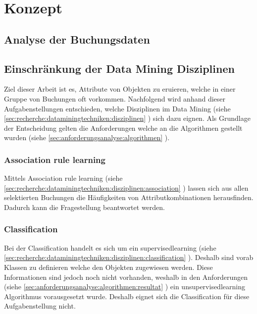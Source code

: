 \chapter{Konzept}
\label{sec:konzept}

\section{Analyse der Buchungsdaten}

\section{Einschränkung der Data Mining Disziplinen}
\label{sec:konzept:disziplinauswahl}
Ziel dieser Arbeit ist es, Attribute von Objekten zu eruieren, welche in einer Gruppe von Buchungen oft vorkommen. Nachfolgend wird anhand dieser Aufgabenstellungen entschieden, welche Disziplinen im Data Mining (siehe \cref{sec:recherche:dataminingtechniken:disziplinen} ) sich dazu eignen. Als Grundlage der Entscheidung gelten die Anforderungen welche an die Algorithmen gestellt wurden (siehe \cref{sec:anforderungsanalyse:algorithmen} ).

\subsection{Association rule learning}
\label{sec:konzept:disziplinauswahl:association}
Mittels Association rule learning (siehe \cref{sec:recherche:dataminingtechniken:disziplinen:association} ) lassen sich aus allen selektierten Buchungen die Häufigkeiten von Attributkombinationen herausfinden. Dadurch kann die Fragestellung beantwortet werden.


\subsection{Classification}
\label{sec:konzept:disziplinauswahl:classification}
Bei der Classification handelt es sich um ein \gls{supervisedlearning} (siehe \cref{sec:recherche:dataminingtechniken:disziplinen:classification} ). Deshalb sind vorab Klassen zu definieren welche den Objekten zugewiesen werden. Diese Informationen sind jedoch noch nicht vorhanden, weshalb in den Anforderungen (siehe \cref{sec:anforderungsanalyse:algorithmen:resultat} ) ein \gls{unsupervisedlearning} Algorithmus vorausgesetzt wurde. Deshalb eignet sich die Classification für diese Aufgabenstellung nicht.

